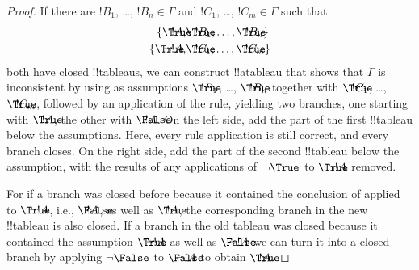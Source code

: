 \documentclass[../../../include/open-logic-section]{subfiles}
\begin{document}
\begin{proof}
  If there are $!B_1$, \dots, $!B_n \in \Gamma$ and $!C_1$, \dots,
  $!C_m \in \Gamma$ such that
  \begin{align*}
    \{\sFmla{\True}{!A}, &
    \sFmla{\True}{!B_1}, \dots, \sFmla{\True}{!B_n}\} \\
    \{\sFmla{\True}{\lnot !A}, &
    \sFmla{\True}{!C_1}, \dots, \sFmla{\True}{!C_m}\}
  \end{align*}
  both have closed !!{tableau}s, we can construct !!a{tableau} that
  shows that $\Gamma$ is inconsistent by using as assumptions
  $\sFmla{\True}{!B_1}$, \dots, $\sFmla{\True}{!B_n}$ together with
  $\sFmla{\True}{!C_1}$, \dots, $\sFmla{\True}{!C_m}$, followed by an
  application of the \Cut{} rule, yielding two branches, one starting
  with $\sFmla{\True}{!A}$, the other with $\sFmla{\False}{!A}$.  On
  the left side, add the part of the first
  !!{tableau} below the assumptions. Here, every rule application is still
  correct, and every branch closes. On the right side, add the part
 of the second !!{tableau}  below the assumption, with the results of
  any applications of~$\TRule{\True}{\lnot}$ to $\sFmla{\True}{\lnot
    !A}$ removed.

  For if a branch was closed before because it contained the
  conclusion of \TRule{\True}{\lnot} applied to $\sFmla{\True}{\lnot
    !A}$, i.e., $\sFmla{\False}{!A}$, as well as $\sFmla{\True}{!A}$,
  the corresponding branch in the new !!{tableau} is also closed. If a
  branch in the old tableau was closed because it contained the
  assumption $\sFmla{\True}{\lnot !A}$ as well as
  $\sFmla{\False}{\lnot !A}$ we can turn it into a closed branch by
  applying $\TRule{\False}{\lnot}$ to $\sFmla{\False}{\lnot !A}$ to
  obtain $\sFmla{\True}{!A}$.
  \end{proof}
\end{document}
